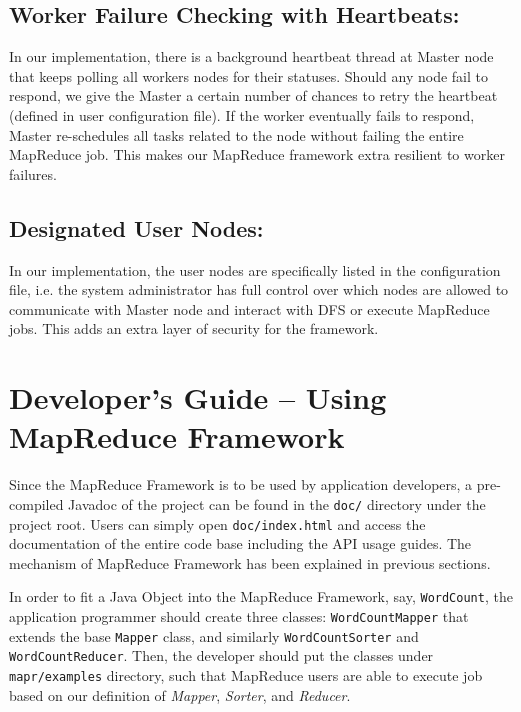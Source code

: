 \documentclass{article} %
\begin{document}
\subsection{Worker Failure Checking with Heartbeats:}
    \par\qquad In our implementation, there is a background heartbeat thread at Master node that keeps polling all workers nodes for their statuses. Should any node fail to respond, we give the Master a certain number of chances to retry the heartbeat (defined in user configuration file). If the worker eventually fails to respond, Master re-schedules all tasks related to the node without failing the entire MapReduce job. This makes our MapReduce framework extra resilient to worker failures.
\subsection{Designated User Nodes:}
    \par\qquad In our implementation, the user nodes are specifically listed in the configuration file, i.e. the system administrator has full control over which nodes are allowed to communicate with Master node and interact with DFS or execute MapReduce jobs. This adds an extra layer of security for the framework.


\section{Developer's Guide -- Using MapReduce Framework}

\par\qquad Since the MapReduce Framework is to be used by application developers, a pre-compiled Javadoc of the project can be found in the \texttt{doc/} directory under the project root. Users can simply open \texttt{doc/index.html} and access the documentation of the entire code base including the API usage guides. The mechanism of MapReduce Framework has been explained in previous sections.

\par\qquad In order to fit a Java Object into the MapReduce Framework, say, \texttt{WordCount}, the application programmer should create three classes: \texttt{WordCountMapper} that extends the base \texttt{Mapper} class, and similarly \texttt{WordCountSorter} and \texttt{WordCountReducer}. Then, the developer should put the classes under \texttt{mapr/examples} directory, such that MapReduce users are able to execute job based on our definition of \emph{Mapper}, \emph{Sorter}, and \emph{Reducer}.
\end{document}
